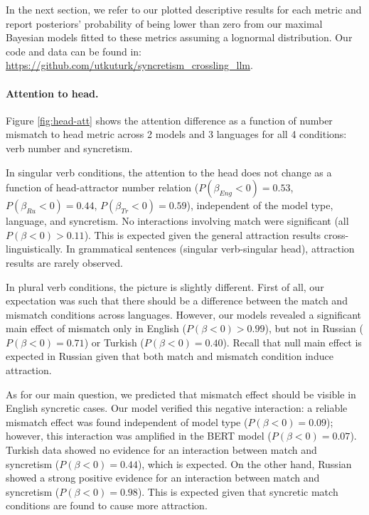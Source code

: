\documentclass[10pt,letterpaper]{article}
\begin{document}
In the next section, we refer to our plotted descriptive results for each metric and report posteriors' probability of being lower than zero from our maximal Bayesian models fitted to these metrics assuming a lognormal distribution. Our code and data can be found in: \url{https://github.com/utkuturk/syncretism_crossling_llm}.

\paragraph{Attention to head.}

Figure \ref{fig:head-att} shows the attention difference as a function of number mismatch to head metric across 2 models and 3 languages for all 4 conditions: verb number and syncretism. 

In singular verb conditions, the attention to the head does not change as a function of head-attractor number relation ($P(\beta_{Eng} < 0) = 0.53$, $P(\beta_{Ru} < 0) = 0.44$, $P(\beta_{Tr} < 0) = 0.59$), independent of the model type, language, and syncretism. No interactions involving match were significant (all $P(\beta < 0) > 0.11$). This is expected given the general attraction results cross-linguistically. In grammatical sentences (singular verb-singular head), attraction results are rarely observed.  

In plural verb conditions, the picture is slightly different. First of all, our expectation was such that there should be a difference  between the match and mismatch conditions across languages. However, our models revealed a significant main effect of mismatch only in English ($P(\beta < 0) > 0.99$), but not in Russian ($P(\beta < 0) = 0.71$) or Turkish ($P(\beta < 0) = 0.40$). Recall that null main effect is expected in Russian given that both match and mismatch condition induce attraction.

As for our main question, we predicted that mismatch effect should be visible in English syncretic cases. Our model verified this negative interaction: a reliable mismatch effect was found independent of model type ($P(\beta < 0) = 0.09$); however, this interaction was amplified in the BERT model ($P(\beta < 0) = 0.07$). Turkish data showed no evidence for an interaction between match and syncretism ($P(\beta < 0) = 0.44$), which is expected. On the other hand, Russian showed a strong positive evidence for an interaction between match and syncretism ($P(\beta < 0) = 0.98$). This is expected given that syncretic match conditions are found to cause more attraction. 
\end{document}

